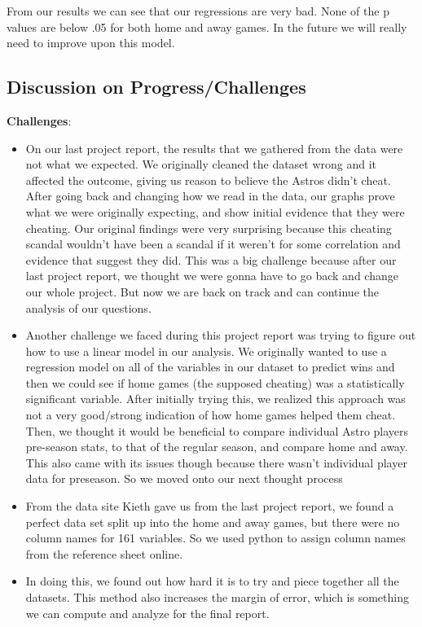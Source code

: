 \documentclass[
]{article}
\begin{document}
From our results we can see that our regressions are very bad. None of
the p values are below .05 for both home and away games. In the future
we will really need to improve upon this model.

\hypertarget{discussion-on-progresschallenges}{%
\subsection{Discussion on
Progress/Challenges}\label{discussion-on-progresschallenges}}

\textbf{Challenges}:

\begin{itemize}
\item
  On our last project report, the results that we gathered from the data
  were not what we expected. We originally cleaned the dataset wrong and
  it affected the outcome, giving us reason to believe the Astros didn't
  cheat. After going back and changing how we read in the data, our
  graphs prove what we were originally expecting, and show initial
  evidence that they were cheating. Our original findings were very
  surprising because this cheating scandal wouldn't have been a scandal
  if it weren't for some correlation and evidence that suggest they did.
  This was a big challenge because after our last project report, we
  thought we were gonna have to go back and change our whole project.
  But now we are back on track and can continue the analysis of our
  questions.
\item
  Another challenge we faced during this project report was trying to
  figure out how to use a linear model in our analysis. We originally
  wanted to use a regression model on all of the variables in our
  dataset to predict wins and then we could see if home games (the
  supposed cheating) was a statistically significant variable. After
  initially trying this, we realized this approach was not a very
  good/strong indication of how home games helped them cheat. Then, we
  thought it would be beneficial to compare individual Astro players
  pre-season stats, to that of the regular season, and compare home and
  away. This also came with its issues though because there wasn't
  individual player data for preseason. So we moved onto our next
  thought process
\item
  From the data site Kieth gave us from the last project report, we
  found a perfect data set split up into the home and away games, but
  there were no column names for 161 variables. So we used python to
  assign column names from the reference sheet online.
\item
  In doing this, we found out how hard it is to try and piece together
  all the datasets. This method also increases the margin of error,
  which is something we can compute and analyze for the final report.
\end{itemize}
\end{document}
